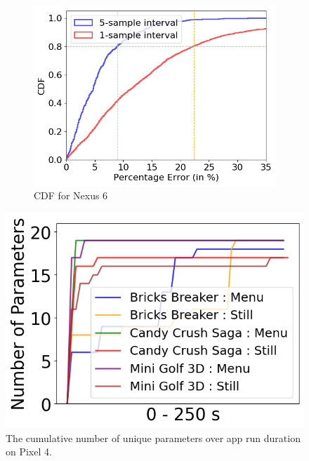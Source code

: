 \begin{figure}[tp]
\begin{minipage}{0.48\columnwidth}
  \begin{subfigure}[b]{0.46\columnwidth}
         \centering
         \includegraphics[width=\textwidth]{figures/sensor_error_cdf_nexus6.png}
         \caption{CDF for Nexus 6}
         \label{fig:sensor_error_cdf_nexus6}
     \end{subfigure}
  \fi
  \caption{Power sensor reading error relative to power monitor reading
        for the YouTube for Moto Z3.
        }
        \label{fig:sensor_error}
        \vspace{-0.1in}
\end{minipage}
\hfill
\begin{minipage}{0.48\columnwidth}

    \centering
    \includegraphics[width=\textwidth]{figures/004_Pixel4_cummulative_macro_parameters.png}
    \vspace{-0.1in}
    \caption{The cumulative number of unique parameters over app run duration on Pixel 4.}
    \label{fig:number_parameters_vs_duration}
    \vspace{-0.1in}
\end{minipage}
\end{figure}


